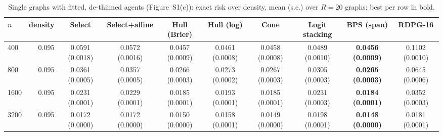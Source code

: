 \documentclass[12pt]{article}
\begin{document}
\begin{table}[ht]
\centering
\caption{Single graphs with fitted, de-thinned agents (Figure~S1(c)): exact risk over density, mean (s.e.) over $R=20$ graphs; best per row in bold.}
\label{tab:single}
\begin{tabular}{lrcccccccc}
\toprule
$n$ & density & Select & Select+affine & Hull (Brier) & Hull (log) & Cone & Logit stacking & BPS (span) & RDPG-16 \\
\midrule
400 & 0.095 & 0.0591 (0.0018) & 0.0572 (0.0016) & 0.0457 (0.0009) & 0.0461 (0.0008) & 0.0458 (0.0008) & 0.0489 (0.0010) & \textbf{0.0456 (0.0009)} & 0.1102 (0.0010) \\
800 & 0.095 & 0.0361 (0.0005) & 0.0357 (0.0005) & 0.0266 (0.0003) & 0.0273 (0.0002) & 0.0267 (0.0003) & 0.0305 (0.0003) & \textbf{0.0265 (0.0003)} & 0.0645 (0.0006) \\
1600 & 0.095 & 0.0231 (0.0001) & 0.0229 (0.0001) & 0.0185 (0.0001) & 0.0193 (0.0001) & 0.0185 (0.0001) & 0.0231 (0.0003) & \textbf{0.0184 (0.0001)} & 0.0352 (0.0003) \\
3200 & 0.095 & 0.0172 (0.0000) & 0.0172 (0.0000) & 0.0150 (0.0000) & 0.0158 (0.0001) & 0.0149 (0.0000) & 0.0198 (0.0001) & \textbf{0.0148 (0.0000)} & 0.0181 (0.0001) \\
\bottomrule
\end{tabular}

\end{table}
\end{document}
